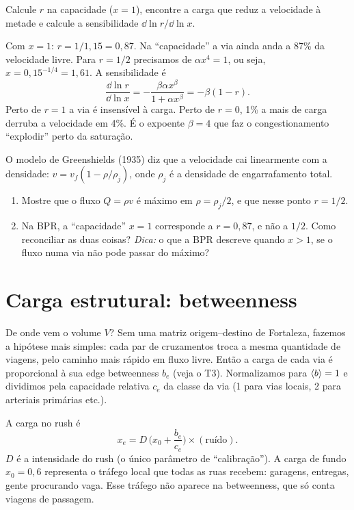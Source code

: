 \documentclass[11pt]{article}
\begin{document}
\begin{exemplo}
Calcule $r$ na capacidade ($x=1$), encontre a carga que reduz a velocidade à metade e calcule a sensibilidade $\dd\ln r/\dd\ln x$.
\end{exemplo}
\begin{solucao}
Com $x=1$: $r = 1/1{,}15 = 0{,}87$. Na ``capacidade'' a via ainda anda a 87\% da velocidade livre. Para $r=1/2$ precisamos de $\alpha x^4 = 1$, ou seja, $x = 0{,}15^{-1/4} = 1{,}61$. A sensibilidade é
\[
\frac{\dd\ln r}{\dd\ln x} = -\frac{\beta\alpha x^\beta}{1+\alpha x^\beta} = -\beta(1-r).
\]
Perto de $r=1$ a via é insensível à carga. Perto de $r=0$, 1\% a mais de carga derruba a velocidade em 4\%. É o expoente $\beta=4$ que faz o congestionamento ``explodir'' perto da saturação.
\end{solucao}

 O modelo de Greenshields (1935) diz que a velocidade cai linearmente com a densidade: $v = v_f(1-\rho/\rho_j)$, onde $\rho_j$ é a densidade de engarrafamento total.
\begin{enumerate}
  \item Mostre que o fluxo $Q = \rho v$ é máximo em $\rho = \rho_j/2$, e que nesse ponto $r = 1/2$.
  \item Na BPR, a ``capacidade'' $x=1$ corresponde a $r=0{,}87$, e não a $1/2$. Como reconciliar as duas coisas? \emph{Dica:} o que a BPR descreve quando $x>1$, se o fluxo numa via não pode passar do máximo?
\end{enumerate}

\section{Carga estrutural: betweenness}

De onde vem o volume $V$? Sem uma matriz origem--destino de Fortaleza, fazemos a hipótese mais simples: cada par de cruzamentos troca a mesma quantidade de viagens, pelo caminho mais rápido em fluxo livre. Então a carga de cada via é proporcional à sua edge betweenness $b_e$ (veja o T3). Normalizamos para $\left\langle b \right\rangle = 1$ e dividimos pela capacidade relativa $c_e$ da classe da via (1 para vias locais, 2 para arteriais primárias etc.).

\begin{ideia}
A carga no rush é
\[
x_e = D\,\Big(x_0 + \frac{b_e}{c_e}\Big)\times(\text{ruído}).
\]
$D$ é a intensidade do rush (o único parâmetro de ``calibração''). A carga de fundo $x_0 = 0{,}6$ representa o tráfego local que todas as ruas recebem: garagens, entregas, gente procurando vaga. Esse tráfego não aparece na betweenness, que só conta viagens de passagem.
\end{ideia}
\end{document}
